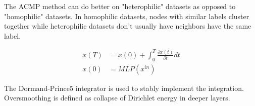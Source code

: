 \documentclass[book.tex]{subfiles}
\begin{document}
The ACMP method can do better on "heterophilic" datasets as opposed to "homophilic" datasets. In homophilic datasets, nodes with similar labels cluster together while heterophilic datasets don't usually have neighbors have the same label.

\begin{align}
x(T) &= x(0) + \int_0^T \frac{\partial x(t)}{\partial t} dt \\
x(0) &= MLP(x^{in})
\end{align}

The Dormand-Prince5 integrator is used to stably implement the integration. Oversmoothing is defined as collapse of Dirichlet energy in deeper layers. 
\end{document}
